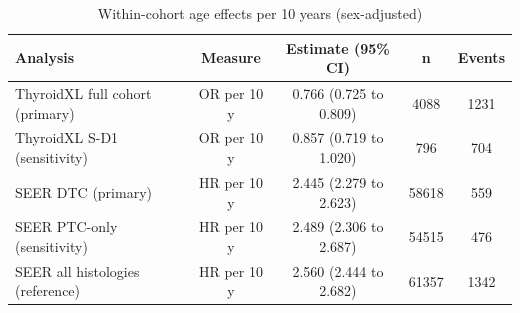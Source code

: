 \begin{table}[htbp]
\caption{Within-cohort age effects per 10 years (sex-adjusted)}\label{tab:s15_age_slopes}
\scriptsize
\begin{tabular*}{\textwidth}{@{\extracolsep{\fill}}lcccc@{}}
\toprule
Analysis & Measure & Estimate (95\% CI) & n & Events \\
\midrule
ThyroidXL full cohort (primary) & OR per 10 y & 0.766 (0.725 to 0.809) & 4088 & 1231 \\
ThyroidXL S-D1 (sensitivity) & OR per 10 y & 0.857 (0.719 to 1.020) & 796 & 704 \\
SEER DTC (primary) & HR per 10 y & 2.445 (2.279 to 2.623) & 58618 & 559 \\
SEER PTC-only (sensitivity) & HR per 10 y & 2.489 (2.306 to 2.687) & 54515 & 476 \\
SEER all histologies (reference) & HR per 10 y & 2.560 (2.444 to 2.682) & 61357 & 1342 \\
\bottomrule
\end{tabular*}
\end{table}
